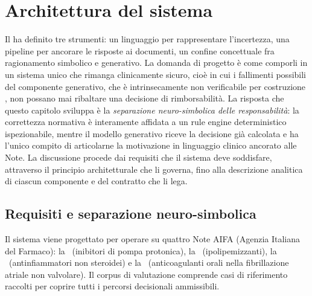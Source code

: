 \chapter{Architettura del sistema}
\label{ch:progettazione}

Il  ha definito tre strumenti: un linguaggio per
rappresentare l'incertezza, una pipeline per ancorare le risposte ai
documenti, un confine concettuale fra ragionamento simbolico e generativo.
La domanda di progetto è come comporli in un sistema unico che rimanga
clinicamente sicuro, cioè in cui i fallimenti possibili del componente
generativo, che è intrinsecamente non verificabile per costruzione
\cite{ji2023hallucination, thirunavukarasu2023llm}, non possano mai
ribaltare una decisione di rimborsabilità. La risposta che questo capitolo
sviluppa è la \emph{separazione neuro-simbolica delle responsabilità}: la
correttezza normativa è interamente affidata a un rule engine deterministico
ispezionabile, mentre il modello generativo riceve la decisione già calcolata
e ha l'unico compito di articolarne la motivazione in linguaggio clinico
ancorato alle Note. La discussione procede dai requisiti che il sistema deve
soddisfare, attraverso il principio architetturale che li governa, fino alla
descrizione analitica di ciascun componente e del contratto che li lega.

\section{Requisiti e separazione neuro-simbolica}
\label{sec:requisiti}

Il sistema viene progettato per operare su quattro Note AIFA (Agenzia Italiana del Farmaco): la \notezero\
(inibitori di pompa protonica), la \notetredici\ (ipolipemizzanti), la \notesessanta\
(antinfiammatori non steroidei) e la \notenova\ (anticoagulanti orali nella
fibrillazione atriale non valvolare).
Il corpus di valutazione comprende \goldn{} casi di riferimento raccolti
per coprire tutti i percorsi decisionali ammissibili.

